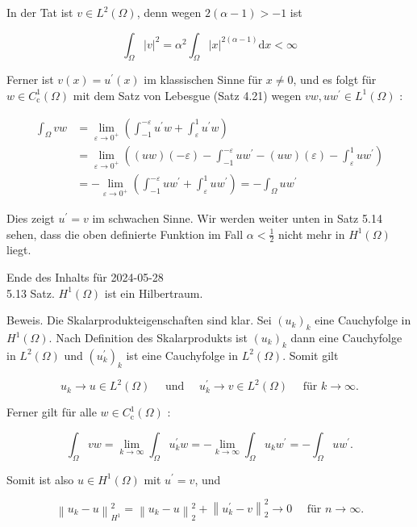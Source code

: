 \documentclass[10pt, letterpaper]{article}
\begin{document}
In der Tat ist $v \in L^{2}(\Omega)$, denn wegen $2(\alpha-1)>-1$ ist

$$
\int_{\Omega}|v|^{2}=\alpha^{2} \int_{\Omega}|x|^{2(\alpha-1)} \mathrm{d} x<\infty
$$

Ferner ist $v(x)=u^{\prime}(x)$ im klassischen Sinne für $x \neq 0$, und es folgt für $w \in C_{\mathrm{c}}^{1}(\Omega)$ mit dem Satz von Lebesgue (Satz 4.21) wegen $v w, u w^{\prime} \in L^{1}(\Omega)$ :

$$
\begin{aligned}
\int_{\Omega} v w & =\lim _{\varepsilon \rightarrow 0^{+}}\left(\int_{-1}^{-\varepsilon} u^{\prime} w+\int_{\varepsilon}^{1} u^{\prime} w\right) \\
& =\lim _{\varepsilon \rightarrow 0^{+}}\left((u w)(-\varepsilon)-\int_{-1}^{-\varepsilon} u w^{\prime}-(u w)(\varepsilon)-\int_{\varepsilon}^{1} u w^{\prime}\right) \\
& =-\lim _{\varepsilon \rightarrow 0^{+}}\left(\int_{-1}^{-\varepsilon} u w^{\prime}+\int_{\varepsilon}^{1} u w^{\prime}\right)=-\int_{\Omega} u w^{\prime}
\end{aligned}
$$

Dies zeigt $u^{\prime}=v$ im schwachen Sinne. Wir werden weiter unten in Satz 5.14 sehen, dass die oben definierte Funktion im Fall $\alpha<\frac{1}{2}$ nicht mehr in $H^{1}(\Omega)$ liegt.

Ende des Inhalts für 2024-05-28\\
5.13 Satz. $H^{1}(\Omega)$ ist ein Hilbertraum.

Beweis. Die Skalarprodukteigenschaften sind klar. Sei $\left(u_{k}\right)_{k}$ eine Cauchyfolge in $H^{1}(\Omega)$. Nach Definition des Skalarprodukts ist $\left(u_{k}\right)_{k}$ dann eine Cauchyfolge in $L^{2}(\Omega)$ und $\left(u_{k}^{\prime}\right)_{k}$ ist eine Cauchyfolge in $L^{2}(\Omega)$. Somit gilt

$$
u_{k} \rightarrow u \in L^{2}(\Omega) \quad \text { und } \quad u_{k}^{\prime} \rightarrow v \in L^{2}(\Omega) \quad \text { für } k \rightarrow \infty .
$$

Ferner gilt für alle $w \in C_{\mathrm{c}}^{1}(\Omega)$ :

$$
\int_{\Omega} v w=\lim _{k \rightarrow \infty} \int_{\Omega} u_{k}^{\prime} w=-\lim _{k \rightarrow \infty} \int_{\Omega} u_{k} w^{\prime}=-\int_{\Omega} u w^{\prime} .
$$

Somit ist also $u \in H^{1}(\Omega)$ mit $u^{\prime}=v$, und

$$
\left\|u_{k}-u\right\|_{H^{1}}^{2}=\left\|u_{k}-u\right\|_{2}^{2}+\left\|u_{k}^{\prime}-v\right\|_{2}^{2} \rightarrow 0 \quad \text { für } n \rightarrow \infty .
$$
\end{document}
